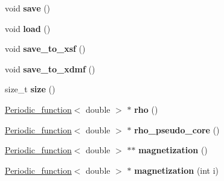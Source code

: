 \begin{DoxyCompactItemize}
\item 
\hypertarget{classsirius_1_1_density_a349e10ada5b6fbb5e8b9d5206aba765c}{}void {\bfseries save} ()\label{classsirius_1_1_density_a349e10ada5b6fbb5e8b9d5206aba765c}

\item 
\hypertarget{classsirius_1_1_density_a78ed4dc5b87a927570fe2e7552c548e1}{}void {\bfseries load} ()\label{classsirius_1_1_density_a78ed4dc5b87a927570fe2e7552c548e1}

\item 
\hypertarget{classsirius_1_1_density_a5cea378baf2b5fab91d738d88d07842e}{}void {\bfseries save\+\_\+to\+\_\+xsf} ()\label{classsirius_1_1_density_a5cea378baf2b5fab91d738d88d07842e}

\item 
\hypertarget{classsirius_1_1_density_af2b76bcacc2db613be601b1484d078bd}{}void {\bfseries save\+\_\+to\+\_\+xdmf} ()\label{classsirius_1_1_density_af2b76bcacc2db613be601b1484d078bd}

\item 
\hypertarget{classsirius_1_1_density_ad9bd68366e88827316be5d813d06cd0c}{}size\+\_\+t {\bfseries size} ()\label{classsirius_1_1_density_ad9bd68366e88827316be5d813d06cd0c}

\item 
\hypertarget{classsirius_1_1_density_a56603ef790c6321f19147e7c7fc413fc}{}\hyperlink{classsirius_1_1_periodic__function}{Periodic\+\_\+function}$<$ double $>$ $\ast$ {\bfseries rho} ()\label{classsirius_1_1_density_a56603ef790c6321f19147e7c7fc413fc}

\item 
\hypertarget{classsirius_1_1_density_add5393ad5f5fc30bab6744f3cfb9a1d0}{}\hyperlink{classsirius_1_1_periodic__function}{Periodic\+\_\+function}$<$ double $>$ $\ast$ {\bfseries rho\+\_\+pseudo\+\_\+core} ()\label{classsirius_1_1_density_add5393ad5f5fc30bab6744f3cfb9a1d0}

\item 
\hypertarget{classsirius_1_1_density_a81e1c48f8abda0a2225601a036b8b519}{}\hyperlink{classsirius_1_1_periodic__function}{Periodic\+\_\+function}$<$ double $>$ $\ast$$\ast$ {\bfseries magnetization} ()\label{classsirius_1_1_density_a81e1c48f8abda0a2225601a036b8b519}

\item 
\hypertarget{classsirius_1_1_density_aab9a15b9ad84afd873449c9f63b7423d}{}\hyperlink{classsirius_1_1_periodic__function}{Periodic\+\_\+function}$<$ double $>$ $\ast$ {\bfseries magnetization} (int i)\label{classsirius_1_1_density_aab9a15b9ad84afd873449c9f63b7423d}


\end{DoxyCompactItemize}
